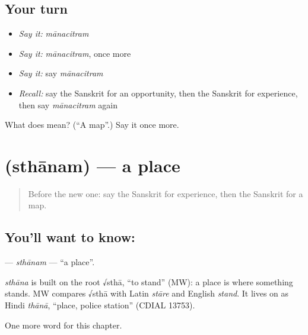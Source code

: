 \subsection*{Your turn}
\begin{itemize}
\raggedright
  \item \emph{Say it:} \emph{mānacitram}
  \item \emph{Say it:} \emph{mānacitram}, once more
  \item \emph{Say it:} say \emph{mānacitram}
  \item \emph{Recall:} say the Sanskrit for an opportunity, then the Sanskrit for experience, then say \emph{mānacitram} again
\end{itemize}

\begin{tcolorbox}[breakable,colback=teal!4,colframe=teal!35!black,title={Before you move on}]
What does  mean? (\textquotedblleft{}A map\textquotedblright{}.) Say it once more.
\end{tcolorbox}
\section[\texorpdfstring{\sk{स्थानम्} (sthānam)}{स्थानम् (sthānam)}]{ (sthānam) — a place}

\label{lesson:SA-C231-sthanam}



\begin{quote}
Before the new one: say the Sanskrit for experience, then the Sanskrit for a map.
\end{quote}

\subsection*{You'll want to know: }
\textbf{} — \emph{sthānam} — \textquotedblleft{}a place\textquotedblright{}.

\begin{cousinweb}
\emph{sthāna} is built on the root √sthā, \textquotedblleft{}to stand\textquotedblright{} (MW): a place is where something stands. MW compares √sthā with Latin \emph{stāre} and English \emph{stand}. It lives on as Hindi \emph{thānā}, \textquotedblleft{}place, police station\textquotedblright{} (CDIAL 13753).
\end{cousinweb}

\begin{grammarlens}[title={What you've built}]
One more word for this chapter.
\end{grammarlens}

